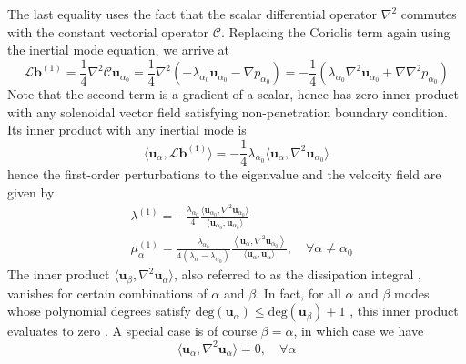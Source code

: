 %
The last equality uses the fact that the scalar differential operator $\nabla^2$ commutes with the constant vectorial operator $\mathcal{C}$. Replacing the Coriolis term again using the inertial mode equation, we arrive at
%
\begin{equation}\label{eqn:Lorentz-order1-ideal}
    \mathcal{L} \mathbf{b}^{(1)} = \frac{1}{4} \nabla^2 \mathcal{C} \mathbf{u}_{\alpha_0} = \frac{1}{4} \nabla^2 \left(- \lambda_{\alpha_0} \mathbf{u}_{\alpha_0} - \nabla p_{\alpha_0}\right) = - \frac{1}{4} \left(\lambda_{\alpha_0} \nabla^2 \mathbf{u}_{\alpha_0} + \nabla \nabla^2 p_{\alpha_0}\right)
\end{equation}
%
Note that the second term is a gradient of a scalar, hence has zero inner product with any solenoidal vector field satisfying non-penetration boundary condition. Its inner product with any inertial mode is
%
\begin{equation}
    \langle \mathbf{u}_{\alpha}, \mathcal{L} \mathbf{b}^{(1)} \rangle = - \frac{1}{4} \lambda_{\alpha_0} \langle  \mathbf{u}_{\alpha}, \nabla^2 \mathbf{u}_{\alpha_0} \rangle
\end{equation}
%
hence the first-order perturbations to the eigenvalue and the velocity field are given by
%
\begin{align}
    &\lambda^{(1)} = -\frac{\lambda_{\alpha_0}}{4} \frac{\langle \mathbf{u}_{\alpha_0}, \nabla^2 \mathbf{u}_{\alpha_0} \rangle}{\langle \mathbf{u}_{\alpha_0}, \mathbf{u}_{\alpha_0} \rangle}
    \\
    &\mu_\alpha^{(1)} = \frac{\lambda_{\alpha_0}}{4(\lambda_\alpha - \lambda_{\alpha_0})} \frac{\left\langle \mathbf{u}_{\alpha}, \nabla^2 \mathbf{u}_{\alpha_0} \right\rangle}{\langle \mathbf{u}_{\alpha}, \mathbf{u}_{\alpha} \rangle},\quad \forall \alpha \neq \alpha_0
\end{align}
%
The inner product $\langle \mathbf{u}_\beta, \nabla^2 \mathbf{u}_\alpha \rangle$, also referred to as the dissipation integral \citep{zhang_theory_2017}, vanishes for certain combinations of $\alpha$ and $\beta$. In fact, for all $\alpha$ and $\beta$ modes whose polynomial degrees satisfy $\mathrm{deg} (\mathbf{u}_\alpha) \leq \mathrm{deg} (\mathbf{u}_\beta) + 1$ \citep[inertial modes are all band-limited polynomials, ][]{zhang_theory_2017}, this inner product evaluates to zero \citep{ivers_enumeration_2015,zhang_theory_2017}. A special case is of course $\beta = \alpha$, in which case we have
%
\begin{equation}
    \langle \mathbf{u}_{\alpha}, \nabla^2 \mathbf{u}_{\alpha} \rangle = 0, \quad \forall \alpha
\end{equation}
